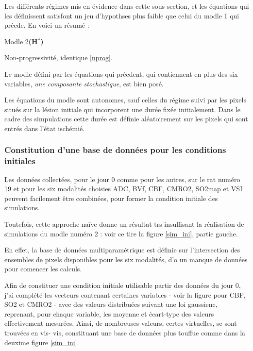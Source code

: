 \ligneinter
Les diff\'erents r\'egimes mis en \'evidence dans cette sous-section, et les \'equations qui les d\'efinissent satisfont %
un jeu d'hypothses plus faible que celui du modle 1 qui pr\'ecde. En voici un r\'esum\'e :

\begin{modmerate}{Modle 2}{\textbf{(H${}^{\ast}$\arabic*)}}
\item Non-progressivit\'e, identique  \ref{nprog}.
\item\label{var_compf} Le modle d\'efini par les \'equations qui pr\'ecdent, %
qui contiennent en plus des six variables, \emph{une composante stochastique}, est bien pos\'e.
\item\label{autof} Les \'equations du modle sont autonomes, sauf celles du r\'egime suivi par les pixels situ\'es sur la l\'esion initiale %
qui incorporent une dur\'ee fix\'ee initialement. %
Dans le cadre des simpulations cette dur\'ee est d\'efinie al\'eatoirement sur les pixels qui sont entr\'es dans l'\'etat isch\'emi\'e.
\end{modmerate}

\newpage
\subsubsection{Constitution d'une base de donn\'ees pour les conditions initiales}

Les donn\'ees collect\'ees, pour le jour 0 comme pour les autres, sur le rat num\'ero 19 %
et pour les six modalit\'es choisies ADC, BVf, CBF, CMRO2, SO2map et VSI peuvent facilement \^etre combin\'ees, %
pour former la condition initiale des simulations.

\par
Toutefois, cette approche na\"ive donne un r\'esultat trs insuffisant  la r\'ealisation de simulations du modle num\'ero 2 : %
voir  ce tire la figure \ref{sim_ini}, partie gauche.

\par
En effet, la base de donn\'ees multiparam\'etrique est d\'efinie sur l'intersection des ensembles de pixels disponibles pour les six modalit\'es, %
d'o un manque de donn\'ees pour comencer les calculs.

\par
Afin de constituer une condition initiale utilisable  partir des donn\'ees du jour 0, j'ai compl\'et\'e les vecteurs contenant certaines variables %
- voir la figure pour CBF, SO2 et CMRO2 - avec des valeurs distribu\'ees suivant une loi gaussiene, reprenant, pour chaque variable, les moyenne et \'ecart-type des valeurs effectivement mesur\'ees. %
Ainsi, de nombreuses valeurs, certes virtuelles, se sont trouv\'ees en vis- vis, constituant une base de donn\'ees plus touffue comme dans la deuxime figure \ref{sim_ini}.

